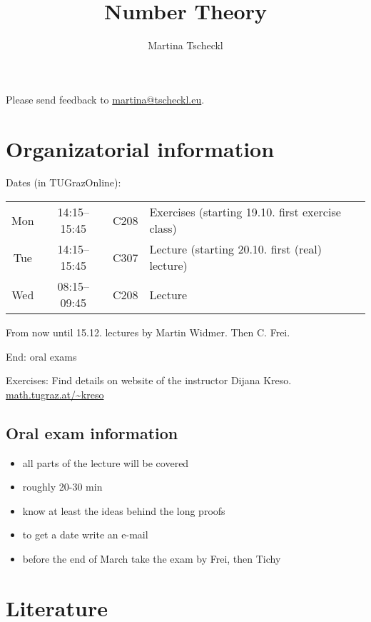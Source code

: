 \documentclass[a4paper]{article}
\author{Martina Tscheckl}
\title{Number Theory}
\begin{document}
\maketitle
Please send feedback to \url{martina@tscheckl.eu}.
\tableofcontents

\section{Organizatorial information}

Dates (in TUGrazOnline):
\begin{table}[!h]
  \begin{tabular}{cccl}
    Mon & 14:15--15:45 & C208 & Exercises (starting 19.10. first exercise class) \\
    Tue & 14:15--15:45 & C307 & Lecture (starting 20.10. first (real) lecture) \\
    Wed & 08:15--09:45 & C208 & Lecture
  \end{tabular}
\end{table}

From now until 15.12. lectures by Martin Widmer.
Then C. Frei.

End: oral exams

Exercises: Find details on website of the instructor Dijana Kreso.
\url{math.tugraz.at/~kreso}

\subsection{Oral exam information}
\begin{itemize}
  \item all parts of the lecture will be covered
  \item roughly 20-30 min 
  \item know at least the ideas behind the long proofs
  \item to get a date write an e-mail
  \item before the end of March take the exam by Frei, then Tichy
\end{itemize}







\section{Literature}
\end{document}
